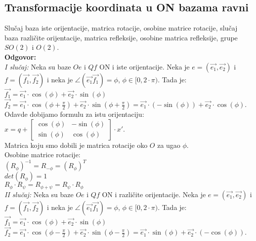 \documentclass[12pt]{article}
\begin{document}
    \subsection{Transformacije koordinata u ON bazama ravni}
    \label{subsec:pitanje_9}
    Slučaj baza iste orijentacije, matrica rotacije, osobine matrice
    rotacije, slučaj baza različite orijentacije, matrica refleksije,
    osobine matrica refleksije, grupe $SO(2)$ i $O(2)$.\\
    \textbf{Odgovor:}\\
    \textit{I slučaj:} Neka su baze $Oe$ i $Qf$ ON i iste orijentacije. Neka je $e=(\overrightarrow{e_1},\overrightarrow{e_2})$
    i $f=(\overrightarrow{f_1},\overrightarrow{f_2})$ i neka je $\angle(\overrightarrow{e_1}\overrightarrow{f_1})=\phi$, $\phi\in[0,2\cdot\pi)$.
    Tada je:\\
$\overrightarrow{f_1}=\overrightarrow{e_1}\cdot\cos(\phi)+\overrightarrow{e_2}\cdot\sin(\phi)$\\
$\overrightarrow{f_2}=\overrightarrow{e_1}\cdot\cos(\phi+\frac{\pi}{2})+\overrightarrow{e_2}\cdot\sin(\phi+\frac{\pi}{2})=\overrightarrow{e_1}\cdot(-\sin(\phi))+\overrightarrow{e_2}\cdot\cos(\phi)$.\\
    Odavde dobijamo formulu za istu orijentaciju: $x=q+\begin{bmatrix}
    \cos(\phi) & -\sin(\phi) \\
    \sin(\phi) & \cos(\phi)
\end{bmatrix}\cdot x'$.\\
    Matrica koju smo dobili je matrica rotacije oko $O$ za ugao $\phi$.\\
    Osobine matrice rotacije:\\
$(R_\phi)^{-1}=R_{-\phi}=(R_\phi)^T$\\
$det(R_\phi)=1$\\
$R_\phi\cdot R_\psi=R_{\phi+\psi}=R_\psi\cdot R_\phi$\\
    \textit{II slučaj:} Neka su baze $Oe$ i $Qf$ ON i različite orijentacije. Neka je $e=(\overrightarrow{e_1},\overrightarrow{e_2})$
    i $f=(\overrightarrow{f_1},\overrightarrow{f_2})$ i neka je $\angle(\overrightarrow{e_1}\overrightarrow{f_1})=\phi$, $\phi\in[0,2\cdot\pi)$.
    Tada je:\\
$\overrightarrow{f_1}=\overrightarrow{e_1}\cdot\cos(\phi)+\overrightarrow{e_2}\cdot\sin(\phi)$\\
$\overrightarrow{f_2}=\overrightarrow{e_1}\cdot\cos(\phi-\frac{\pi}{2})+\overrightarrow{e_2}\cdot\sin(\phi-\frac{\pi}{2})=\overrightarrow{e_1}\cdot\sin(\phi)+\overrightarrow{e_2}\cdot(-\cos(\phi))$.\\
\end{document}
